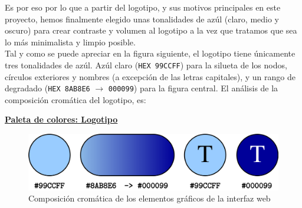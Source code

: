 \documentclass[../ei103948-project-documentation.tex]{subfiles}
\begin{document}
                            Es por eso por lo que a partir del logotipo, y sus motivos principales en este proyecto, hemos finalmente elegido unas tonalidades de azúl (claro, medio y oscuro) para crear contraste y volumen al logotipo a la vez que tratamos que sea lo más minimalista y limpio posible.\\
                            
                            Tal y como se puede apreciar en la figura siguiente, el logotipo tiene únicamente tres tonalidades de azúl. Azúl claro (\texttt{HEX 99CCFF}) para la silueta de los nodos, círculos exteriores y nombres (a excepción de las letras capitales), y un rango de degradado (\texttt{HEX 8AB8E6} $\rightarrow$ \texttt{000099}) para la figura central. El análisis de la composición cromática del logotipo, es:

                            \newpage

                            \begin{center}
                                \underline{\textbf{Paleta de colores: Logotipo}}
                            \end{center}

                            \begin{figure}[H]
                                \begin{center}
                                \includegraphics[scale=0.065]{images/ColoresLogoEsquema.png}
                                \end{center}
                                \caption{Composición cromática de los elementos gráficos de la interfaz web}
                            \end{figure}

                            \vspace*{10mm}
                    
\end{document}
